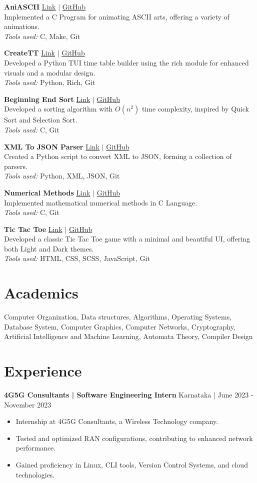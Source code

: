 \documentclass[a4paper,10pt]{article}
\newcommand{\projectentry}[5]{
  \noindent
  \textbf{#1} \hfill
  \href{#4}{Link} $|$ \href{#5}{GitHub} \\
  #2 \\
  \textit{Tools used:} #3
  \vspace{6pt} %
}
\begin{document}
\projectentry{AniASCII}{
  Implemented a C Program for animating ASCII arts, offering a variety of animations.
}{
  C, Make, Git
}{https://github.com/surajkareppagol/ANIASCII}{https://github.com/surajkareppagol/ANIASCII}

\projectentry{CreateTT}{
  Developed a Python TUI time table builder using the rich module for enhanced visuals and a modular design.
}{
  Python, Rich, Git
}{https://github.com/surajkareppagol/CreateTT}{https://github.com/surajkareppagol/CreateTT}

\projectentry{Beginning End Sort}{
  Developed a sorting algorithm with $O(n^2)$ time complexity, inspired by Quick Sort and Selection Sort.
}{
  C, Git
}{https://github.com/surajkareppagol/BESort}{https://github.com/surajkareppagol/BESort}

\projectentry{XML To JSON Parser}{
  Created a Python script to convert XML to JSON, forming a collection of parsers.
}{
  Python, XML, JSON, Git
}{https://github.com/surajkareppagol/Parser}{https://github.com/surajkareppagol/Parser}

\projectentry{Numerical Methods}{
  Implemented mathematical numerical methods in C Language.
}{
  C, Git
}{https://github.com/surajkareppagol/Numerical-Methods}{https://github.com/surajkareppagol/Numerical-Methods}

\projectentry{Tic Tac Toe}{
  Developed a classic Tic Tac Toe game with a minimal and beautiful UI, offering both Light and Dark themes.
}{
  HTML, CSS, SCSS, JavaScript, Git
}{https://surajkareppagol.github.io/Tic-Tac-Toe/}{https://github.com/surajkareppagol/Tic-Tac-Toe}

\section*{Academics}
Computer Organization, Data structures, Algorithms, Operating Systems, Database System, Computer Graphics, Computer Networks, Cryptography, Artificial Intelligence and Machine Learning, Automata Theory, Compiler Design

\section*{Experience}
\noindent
\textbf{4G5G Consultants | Software Engineering Intern} \hfill Karnataka | June 2023 - November 2023
\begin{itemize}[left=0pt]
  \item Internship at 4G5G Consultants, a Wireless Technology company.
  \item Tested and optimized RAN configurations, contributing to enhanced network performance.
  \item Gained proficiency in Linux, CLI tools, Version Control Systems, and cloud technologies.
\end{itemize}
\end{document}

